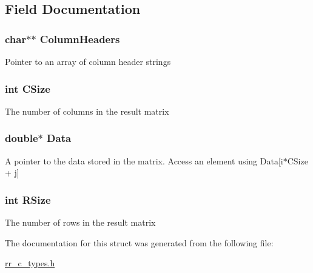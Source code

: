 \subsection{\-Field \-Documentation}
\hypertarget{struct_r_r_result_ab339159e5604808f92fe793f4f43da03}{
\subsubsection[{\-Column\-Headers}]{\setlength{\rightskip}{0pt plus 5cm}char$\ast$$\ast$ {\bf \-Column\-Headers}}}
\label{struct_r_r_result_ab339159e5604808f92fe793f4f43da03}
\-Pointer to an array of column header strings \hypertarget{struct_r_r_result_a17c9a5894aa9cb3789346dcaa9c370bb}{
\subsubsection[{\-C\-Size}]{\setlength{\rightskip}{0pt plus 5cm}int {\bf \-C\-Size}}}
\label{struct_r_r_result_a17c9a5894aa9cb3789346dcaa9c370bb}
\-The number of columns in the result matrix \hypertarget{struct_r_r_result_a7c5cbda3aa940f4b0d6e8a1679307dfc}{
\subsubsection[{\-Data}]{\setlength{\rightskip}{0pt plus 5cm}double$\ast$ {\bf \-Data}}}
\label{struct_r_r_result_a7c5cbda3aa940f4b0d6e8a1679307dfc}
\-A pointer to the data stored in the matrix. \-Access an element using \-Data\mbox{[}i$\ast$\-C\-Size + j\mbox{]} \hypertarget{struct_r_r_result_a4d8512c879223c0e0d1522dae38e7819}{
\subsubsection[{\-R\-Size}]{\setlength{\rightskip}{0pt plus 5cm}int {\bf \-R\-Size}}}
\label{struct_r_r_result_a4d8512c879223c0e0d1522dae38e7819}
\-The number of rows in the result matrix 

\-The documentation for this struct was generated from the following file\-:\begin{DoxyCompactItemize}
\item 
\hyperlink{rr__c__types_8h}{rr\-\_\-c\-\_\-types.\-h}\end{DoxyCompactItemize}
